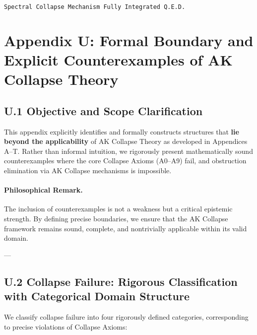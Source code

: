 \documentclass[11pt]{article}
\begin{document}
\begin{flushright}
\texttt{Spectral Collapse Mechanism \quad Fully Integrated \quad Q.E.D.}
\end{flushright}




\section*{Appendix U: Formal Boundary and Explicit Counterexamples of AK Collapse Theory}

\subsection*{U.1 Objective and Scope Clarification}

This appendix explicitly identifies and formally constructs structures that \textbf{lie beyond the applicability} of AK Collapse Theory as developed in Appendices A–T.  
Rather than informal intuition, we rigorously present mathematically sound counterexamples where the core Collapse Axioms (A0–A9) fail, and obstruction elimination via AK Collapse mechanisms is impossible.

\paragraph{Philosophical Remark.}  
The inclusion of counterexamples is not a weakness but a critical epistemic strength.  
By defining precise boundaries, we ensure that the AK Collapse framework remains sound, complete, and nontrivially applicable within its valid domain.

---

\subsection*{U.2 Collapse Failure: Rigorous Classification with Categorical Domain Structure}

We classify collapse failure into four rigorously defined categories, corresponding to precise violations of Collapse Axioms:
\end{document}
